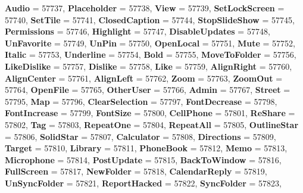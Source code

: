\begin{DoxyCompactItemize}
\newline
{\bfseries Audio} = 57737, 
{\bfseries Placeholder} = 57738, 
{\bfseries View} = 57739, 
{\bfseries Set\+Lock\+Screen} = 57740, 
\newline
{\bfseries Set\+Tile} = 57741, 
{\bfseries Closed\+Caption} = 57744, 
{\bfseries Stop\+Slide\+Show} = 57745, 
{\bfseries Permissions} = 57746, 
\newline
{\bfseries Highlight} = 57747, 
{\bfseries Disable\+Updates} = 57748, 
{\bfseries Un\+Favorite} = 57749, 
{\bfseries Un\+Pin} = 57750, 
\newline
{\bfseries Open\+Local} = 57751, 
{\bfseries Mute} = 57752, 
{\bfseries Italic} = 57753, 
{\bfseries Underline} = 57754, 
\newline
{\bfseries Bold} = 57755, 
{\bfseries Move\+To\+Folder} = 57756, 
{\bfseries Like\+Dislike} = 57757, 
{\bfseries Dislike} = 57758, 
\newline
{\bfseries Like} = 57759, 
{\bfseries Align\+Right} = 57760, 
{\bfseries Align\+Center} = 57761, 
{\bfseries Align\+Left} = 57762, 
\newline
{\bfseries Zoom} = 57763, 
{\bfseries Zoom\+Out} = 57764, 
{\bfseries Open\+File} = 57765, 
{\bfseries Other\+User} = 57766, 
\newline
{\bfseries Admin} = 57767, 
{\bfseries Street} = 57795, 
{\bfseries Map} = 57796, 
{\bfseries Clear\+Selection} = 57797, 
\newline
{\bfseries Font\+Decrease} = 57798, 
{\bfseries Font\+Increase} = 57799, 
{\bfseries Font\+Size} = 57800, 
{\bfseries Cell\+Phone} = 57801, 
\newline
{\bfseries Re\+Share} = 57802, 
{\bfseries Tag} = 57803, 
{\bfseries Repeat\+One} = 57804, 
{\bfseries Repeat\+All} = 57805, 
\newline
{\bfseries Outline\+Star} = 57806, 
{\bfseries Solid\+Star} = 57807, 
{\bfseries Calculator} = 57808, 
{\bfseries Directions} = 57809, 
\newline
{\bfseries Target} = 57810, 
{\bfseries Library} = 57811, 
{\bfseries Phone\+Book} = 57812, 
{\bfseries Memo} = 57813, 
\newline
{\bfseries Microphone} = 57814, 
{\bfseries Post\+Update} = 57815, 
{\bfseries Back\+To\+Window} = 57816, 
{\bfseries Full\+Screen} = 57817, 
\newline
{\bfseries New\+Folder} = 57818, 
{\bfseries Calendar\+Reply} = 57819, 
{\bfseries Un\+Sync\+Folder} = 57821, 
{\bfseries Report\+Hacked} = 57822, 
\newline
{\bfseries Sync\+Folder} = 57823, 

\end{DoxyCompactItemize}
